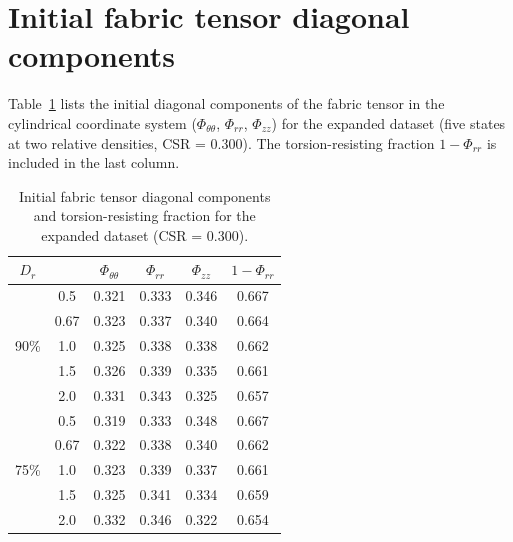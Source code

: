 \section{Initial fabric tensor diagonal components}
\label{sec:appendix_fabric}

Table~\ref{tab:fabric_diagonal} lists the initial diagonal components of the fabric tensor in the cylindrical coordinate system ($\Phi_{\theta\theta}$, $\Phi_{rr}$, $\Phi_{zz}$) for the expanded dataset (five \Kzero{} states at two relative densities, CSR = 0.300). The torsion-resisting fraction $1 - \Phi_{rr}$ is included in the last column.

\begin{table}[h]
\centering
\caption{Initial fabric tensor diagonal components and torsion-resisting fraction for the expanded dataset (CSR = 0.300).}
\label{tab:fabric_diagonal}
\small
\begin{tabular}{cccccc}
\toprule
$D_r$ & \Kzero{} & $\Phi_{\theta\theta}$ & $\Phi_{rr}$ & $\Phi_{zz}$ & $1-\Phi_{rr}$ \\
\midrule
\multirow{5}{*}{90\%}
& 0.5  & 0.321 & 0.333 & 0.346 & 0.667 \\
& 0.67 & 0.323 & 0.337 & 0.340 & 0.664 \\
& 1.0  & 0.325 & 0.338 & 0.338 & 0.662 \\
& 1.5  & 0.326 & 0.339 & 0.335 & 0.661 \\
& 2.0  & 0.331 & 0.343 & 0.325 & 0.657 \\
\midrule
\multirow{5}{*}{75\%}
& 0.5  & 0.319 & 0.333 & 0.348 & 0.667 \\
& 0.67 & 0.322 & 0.338 & 0.340 & 0.662 \\
& 1.0  & 0.323 & 0.339 & 0.337 & 0.661 \\
& 1.5  & 0.325 & 0.341 & 0.334 & 0.659 \\
& 2.0  & 0.332 & 0.346 & 0.322 & 0.654 \\
\bottomrule
\end{tabular}
\end{table}
